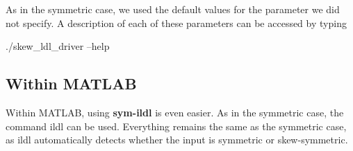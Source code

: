 As in the symmetric case, we used the default values for the parameter we did not specify. A description of each of these parameters can be accessed by typing 
\begin{DoxyCode}
./skew\_ldl\_driver --help 
\end{DoxyCode}
\hypertarget{index_skew_matlab_mex}{}\subsection{Within M\+A\+T\+L\+AB}\label{index_skew_matlab_mex}
Within M\+A\+T\+L\+AB, using {\bfseries sym-\/ildl} is even easier. As in the symmetric case, the command {\ttfamily ildl} can be used. Everything remains the same as the symmetric case, as {\ttfamily ildl} automatically detects whether the input is symmetric or skew-\/symmetric.

